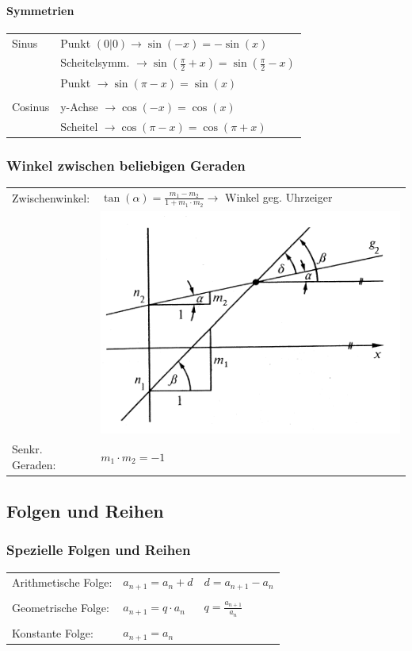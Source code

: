 			\paragraph{Symmetrien} 
				\begin{tabular}{ll}
					Sinus & Punkt $(0|0) \rightarrow \sin(-x) = - \sin(x)$ \\
					      & Scheitelsymm. $\rightarrow \sin(\frac{\pi}{2} + x) = \sin(\frac{\pi}{2} - x)$ \\
					      & Punkt $\rightarrow \sin(\pi - x) = \sin(x)$ \\
					\\
					Cosinus & y-Achse $\rightarrow \cos(-x) = \cos(x)$ \\
					        & Scheitel $\rightarrow \cos(\pi - x) = \cos(\pi + x)$ \\		
				\end{tabular}
				
		\subsubsection{Winkel zwischen beliebigen Geraden}
			\begin{tabular}{ll}
				Zwischenwinkel: & $\tan(\alpha) = \frac{m_1 - m_2}{1 + m_1 \cdot m_2} \rightarrow$ Winkel geg. Uhrzeiger \\
				                & \includegraphics[width=0.3\linewidth]{Bilder/zwischenwinkel.png}\\
				Senkr. Geraden: & $m_1 \cdot m_2 = -1$ \\
			\end{tabular}
            
	\subsection{Folgen und Reihen}
			
		\subsubsection{Spezielle Folgen und Reihen}
			\begin{tabular}{lll}
				Arithmetische Folge: & $a_{n+1} = a_n + d$ & $d = a_{n+1} - a_n$ \\
				\\
				Geometrische Folge: & $a_{n+1} = q \cdot a_n $ & $q = \frac{a_{n+1}}{a_n}$ \\
				\\
				Konstante Folge: & $a_{n+1} = a_n$  & \\
			\end{tabular}				
				
